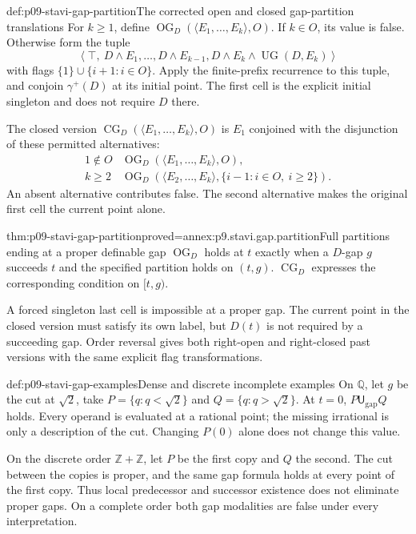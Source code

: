 \begin{hbdefinition}{def:p09-stavi-gap-partition}{The corrected open and closed gap-partition translations}
For \(k\geq1\), define
\(\operatorname{OG}_D(\langle E_1,\ldots,E_k\rangle,O)\).
If \(k\in O\), its value is false.
Otherwise form the tuple
\[
 \left\langle
   \top,\ D\land E_1,\ldots,D\land E_{k-1},
                D\land E_k\land\operatorname{UG}(D,E_k)
 \right\rangle
\]
with flags
\(\{1\}\cup\{i+1:i\in O\}\).
Apply the finite-prefix recurrence
to this tuple, and conjoin
\(\gamma^+(D)\) at its initial
point. The first cell is the
explicit initial singleton and
does not require \(D\) there.

The closed version
\(\operatorname{CG}_D(\langle E_1,\ldots,E_k\rangle,O)\)
is \(E_1\) conjoined with the
disjunction of these permitted
alternatives:
\[
\begin{array}{c|l}
 1\notin O&
  \operatorname{OG}_D(\langle E_1,\ldots,E_k\rangle,O),\\
 k\geq2&
  \operatorname{OG}_D(\langle E_2,\ldots,E_k\rangle,
                         \{i-1:i\in O,\ i\geq2\}).
\end{array}
\]
An absent alternative contributes
false. The second alternative
makes the original first cell
the current point alone.
\end{hbdefinition}

\begin{hbtheorem}{thm:p09-stavi-gap-partition}{proved=annex:p9.stavi.gap.partition}{Full partitions ending at a proper definable gap}
\(\operatorname{OG}_D\) holds at \(t\)
exactly when a \(D\)-gap \(g\)
succeeds \(t\) and the specified
partition holds on \((t,g)\).
\(\operatorname{CG}_D\) expresses
the corresponding condition on
\([t,g)\).

A forced singleton last cell
is impossible at a proper gap.
The current point in the closed
version must satisfy its own
label, but \(D(t)\) is not
required by a succeeding gap.
Order reversal gives both
right-open and right-closed
past versions with the same
explicit flag transformations.
\end{hbtheorem}

\begin{hbexample}{def:p09-stavi-gap-examples}{Dense and discrete incomplete examples}
On \(\mathbb Q\), let \(g\) be
the cut at \(\sqrt2\), take
\(P=\{q:q<\sqrt2\}\) and
\(Q=\{q:q>\sqrt2\}\).
At \(t=0\),
\(P\mathbin{\mathsf U_{\mathrm{gap}}}Q\)
holds. Every operand is evaluated
at a rational point; the missing
irrational is only a description
of the cut. Changing \(P(0)\)
alone does not change this value.

On the discrete order
\(\mathbb Z+\mathbb Z\), let
\(P\) be the first copy and
\(Q\) the second. The cut
between the copies is proper,
and the same gap formula holds
at every point of the first
copy. Thus local predecessor
and successor existence does
not eliminate proper gaps.
On a complete order both gap
modalities are false under
every interpretation.
\end{hbexample}

